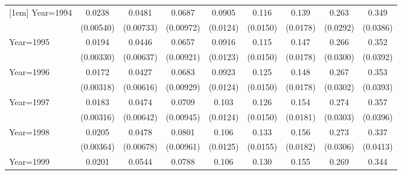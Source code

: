 \begin{table}[htbp]
\begin{tabular}{l*{8}{c}}
[1em]
Year=1994           &      0.0238\sym{***}&      0.0481\sym{***}&      0.0687\sym{***}&      0.0905\sym{***}&       0.116\sym{***}&       0.139\sym{***}&       0.263\sym{***}&       0.349\sym{***}\\
                    &   (0.00540)         &   (0.00733)         &   (0.00972)         &    (0.0124)         &    (0.0150)         &    (0.0178)         &    (0.0292)         &    (0.0386)         \\
[1em]
Year=1995           &      0.0194\sym{***}&      0.0446\sym{***}&      0.0657\sym{***}&      0.0916\sym{***}&       0.115\sym{***}&       0.147\sym{***}&       0.266\sym{***}&       0.352\sym{***}\\
                    &   (0.00330)         &   (0.00637)         &   (0.00921)         &    (0.0123)         &    (0.0150)         &    (0.0178)         &    (0.0300)         &    (0.0392)         \\
[1em]
Year=1996           &      0.0172\sym{***}&      0.0427\sym{***}&      0.0683\sym{***}&      0.0923\sym{***}&       0.125\sym{***}&       0.148\sym{***}&       0.267\sym{***}&       0.353\sym{***}\\
                    &   (0.00318)         &   (0.00616)         &   (0.00929)         &    (0.0124)         &    (0.0150)         &    (0.0178)         &    (0.0302)         &    (0.0393)         \\
[1em]
Year=1997           &      0.0183\sym{***}&      0.0474\sym{***}&      0.0709\sym{***}&       0.103\sym{***}&       0.126\sym{***}&       0.154\sym{***}&       0.274\sym{***}&       0.357\sym{***}\\
                    &   (0.00316)         &   (0.00642)         &   (0.00945)         &    (0.0124)         &    (0.0150)         &    (0.0181)         &    (0.0303)         &    (0.0396)         \\
[1em]
Year=1998           &      0.0205\sym{***}&      0.0478\sym{***}&      0.0801\sym{***}&       0.106\sym{***}&       0.133\sym{***}&       0.156\sym{***}&       0.273\sym{***}&       0.337\sym{***}\\
                    &   (0.00364)         &   (0.00678)         &   (0.00961)         &    (0.0125)         &    (0.0155)         &    (0.0182)         &    (0.0306)         &    (0.0413)         \\
[1em]
Year=1999           &      0.0201\sym{***}&      0.0544\sym{***}&      0.0788\sym{***}&       0.106\sym{***}&       0.130\sym{***}&       0.155\sym{***}&       0.269\sym{***}&       0.344\sym{***}\\

\end{tabular}
\end{table}
